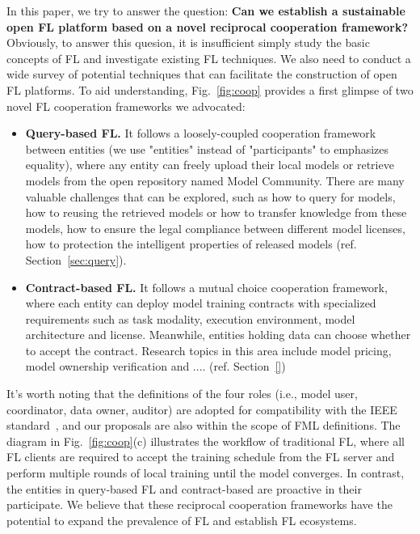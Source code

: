 In this paper, we try to answer the question: \textbf{Can we establish a sustainable open FL platform based on a novel reciprocal cooperation framework?}
Obviously, to answer this quesion, it is insufficient simply study the basic concepts of FL and investigate existing FL techniques.
We also need to conduct a wide survey of potential techniques that can facilitate the construction of open FL platforms.
To aid understanding, Fig.~\ref{fig:coop} provides a first glimpse of two novel FL cooperation frameworks we advocated: 
\begin{itemize}
    \item \textbf{Query-based FL.} It follows a loosely-coupled cooperation framework between entities (we use "entities" instead of "participants" to emphasizes equality), where any entity can freely upload their local models or retrieve models from the open repository named Model Community.
    There are many valuable challenges that can be explored, such as how to query for models, how to reusing the retrieved models or how to transfer knowledge from these models, how to ensure the legal compliance between different model licenses, how to protection the intelligent properties of released models (ref. Section~\ref{sec:query}). %
    \item \textbf{Contract-based FL.} It follows a mutual choice cooperation framework, where each entity can deploy model training contracts with specialized requirements such as task modality, execution environment, model architecture and license. Meanwhile, entities holding data can choose whether to accept the contract.
    Research topics in this area include model pricing, model ownership verification and .... (ref. Section~\ref{}) %
\end{itemize}
It's worth noting that the definitions of the four roles (i.e., model user, coordinator, data owner, auditor) are adopted for compatibility with the IEEE standard~\cite{IEEEstd3652}, and our proposals are also within the scope of FML definitions. 
The diagram in Fig.~\ref{fig:coop}(c) illustrates the workflow of traditional FL, where all FL clients are required to accept the training schedule from the FL server and perform multiple rounds of local training until the model converges.
In contrast, the entities in query-based FL and contract-based are proactive in their participate.
We believe that these reciprocal cooperation frameworks have the potential to expand the prevalence of FL and establish FL ecosystems.


